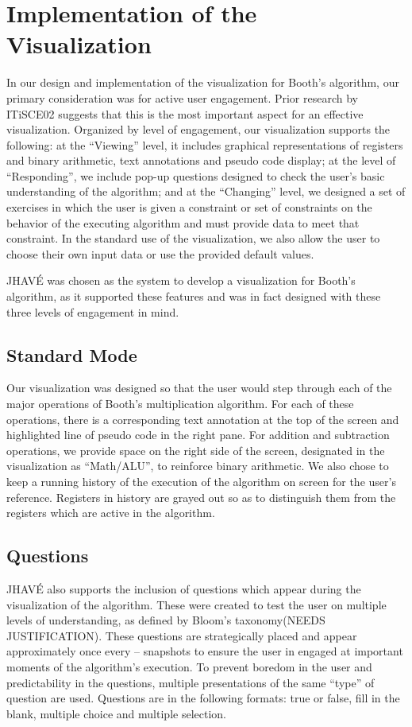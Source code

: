 \documentclass{acm_proc_article-sp}
\begin{document}
\section{Implementation of the Visualization}
In our design and implementation of the visualization for Booth's algorithm, our primary consideration was for active user engagement.
Prior research by ITiSCE02 suggests that this is the most important aspect for an effective visualization.\cite{tnaps:visengage}
Organized by level of engagement, our visualization supports the following: at the ``Viewing'' level, it includes graphical representations of registers and binary arithmetic, text annotations and pseudo code
 display; at the level of ``Responding'', we include pop-up questions designed to check the user's basic understanding of the algorithm; and at the ``Changing'' level, we designed a set of exercises in which the user is given a constraint or set of constraints on the behavior of the executing algorithm and must provide data to meet that constraint.
In the standard use of the visualization, we also allow the user to choose their own input data or use the provided default values.

JHAVÉ was chosen as the system to develop a visualization for Booth's algorithm, as it supported these features and was in fact designed with these three levels of engagement in mind.\cite{JHAVE}

\subsection{Standard Mode}
Our visualization was designed so that the user would step through each of the major operations of Booth's multiplication algorithm.
For each of these operations, there is a corresponding text annotation at the top of the screen and highlighted line of pseudo code in the right pane.
For addition and subtraction operations, we provide space on the right side of the screen, designated in the visualization as ``Math/ALU'', to reinforce binary arithmetic.
We also chose to keep a running history of the execution of the algorithm on screen for the user's reference.
Registers in history are grayed out so as to distinguish them from the registers which are active in the algorithm.
\subsection{Questions}
JHAVÉ also supports the inclusion of questions which appear during the visualization of the algorithm.
These were created to test the user on multiple levels of understanding, as defined by Bloom's taxonomy(NEEDS JUSTIFICATION).
These questions are strategically placed and appear approximately once every -- snapshots to ensure the user in engaged at important moments of the algorithm's execution.
To prevent boredom in the user and predictability in the questions, multiple presentations of the same ``type'' of question are used.
Questions are in the following formats: true or false, fill in the blank, multiple choice and multiple selection.
\end{document}
